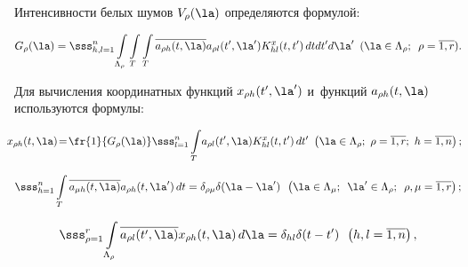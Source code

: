 Интенсивности белых шумов $V_\rho (\la)$ определяются формулой:

     \begin{equation*}

     G_\rho (\la) = \sss_{h,l=1}^n   \int\limits_{\Lambda_\rho}\int\limits_{T}\int\limits_T 

\overline{a_{\rho h} (t,\la)}a_{\rho l}(t',\la') K_{hl}^x (t,t')\, dt 

dt'd\la'\enskip (\la\in \Lambda_\rho; \enskip \rho=\overline{1,r}).


\end{equation*}

Для вычисления координатных функций $x_{\rho h} (t',\la')$ и~функций $a_{\rho h} 

(t,\la)$ используются формулы:

 \begin{multline}

\hspace*{-7pt}x_{\rho h} (t,\la)\! =\!\fr{1}{G_\rho (\la)} \sss_{l=1}^n \int\limits_T \! a_{\rho l} 

(t',\la)K_{hl}^x(t,t')\,dt'\ \left(\la\in \Lambda_\rho; \ \rho=\overline{1,r};\ h=\overline{1,n}\right);

\label{e2.5-sin}

\end{multline}



\vspace*{-9pt}



\noindent

   \begin{equation}

   \sss_{h=1}^n \int\limits_T \overline{a_{\mu h} (t,\la)}a_{\rho h} 

(t,\la')\,dt=\delta_{\rho \mu} \delta (\la-\la')\enskip \left(\la\in \Lambda_\mu; 

\enskip \la'\in \Lambda_\rho;\enskip \rho,\mu=\overline{1,r}\right);

\label{e2.6-sin}

\end{equation}

\begin{equation*}

\sss_{\rho=1}^r \int\limits_{\Lambda_\rho} \overline{a_{\rho l} (t',\la)}x_{\rho 

h} (t,\la)\,d\la=\delta_{hl} \delta (t-t')\enskip 

\left(h,l=\overline{1,n}\right),


\end{equation*}

